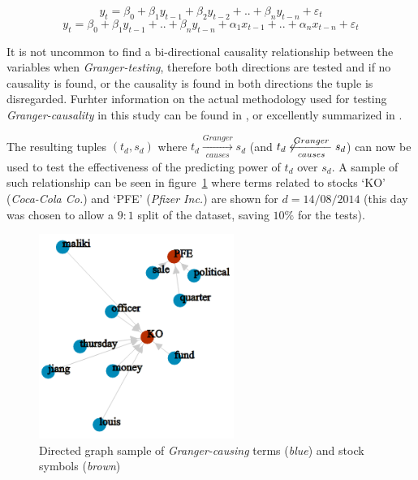 \documentclass[conference,11pt]{IEEEtran}
\begin{document}
\begin{equation}
\label{eq:1}
y_t=\beta_0 + \beta_1 y_{t-1} + \beta_2 y_{t-2} + .. + \beta_n y_{t-n} + \varepsilon_t
\end{equation}
\begin{equation}
\label{eq:2}
y_t=\beta_0 + \beta_1 y_{t-1} + .. + \beta_n y_{t-n} + 
\alpha_1 x_{t-1} + .. + \alpha_n x_{t-n}
+ \varepsilon_t
\end{equation}

\par
It is not uncommon to find a bi-directional causality relationship between the variables when \textit{Granger-testing}, therefore both directions are tested and if no causality is found, or the causality is found in both directions the tuple is disregarded. Furhter information on the actual methodology used for testing \textit{Granger-causality} in this study can be found in \citep{Toda1995}, or excellently summarized in \citep{Giles2011}.

\par
The resulting tuples \((t_d, s_d)\) where \(t_d \xrightarrow[causes]{Granger} s_d\) (and \(t_d \not\xleftarrow[causes]{Granger} s_d\)) can now be used to test the effectiveness of the predicting power of \(t_d\) over \(s_d\). A sample of such relationship can be seen in figure~\ref{fig:term_stocks} where terms related to stocks `KO' (\textit{Coca-Cola Co.}) and `PFE' (\textit{Pfizer Inc.}) are shown for \(d=14/08/2014\) (this day was chosen to allow a \(9:1\) split of the dataset, saving \(10\%\) for the tests).

\begin{figure}[!htbp]
\centering
\includegraphics[width=2.5in]{force_20140814_small}
\caption{Directed graph sample of \textit{Granger-causing} terms (\textit{blue}) and stock symbols (\textit{brown})}
\label{fig:term_stocks}
\end{figure}
\end{document}
